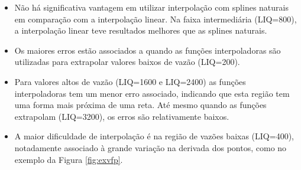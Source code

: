 \documentclass[final,5p]{elsarticle}
\numberwithin{equation}{section}
\begin{document}
        \begin{itemize}
            \item Não há significativa vantagem em utilizar interpolação com splines naturais em comparação com a interpolação linear. Na faixa intermediária (LIQ=800), a interpolação linear teve resultados melhores que as splines naturais.
            \item Os maiores erros estão associados a quando as funções interpoladoras são utilizadas para extrapolar valores baixos de vazão (LIQ=200).
            \item Para valores altos de vazão (LIQ=1600 e LIQ=2400) as funções interpoladoras tem um menor erro associado, indicando que esta região tem uma forma mais próxima de uma reta. Até mesmo quando as funções extrapolam (LIQ=3200), os erros são relativamente baixos.
            \item A maior dificuldade de interpolação é na região de vazões baixas (LIQ=400), notadamente associado à grande variação na derivada dos pontos, como no exemplo da Figura \ref{fig:exvfp}.
        \end{itemize}
\end{document}
